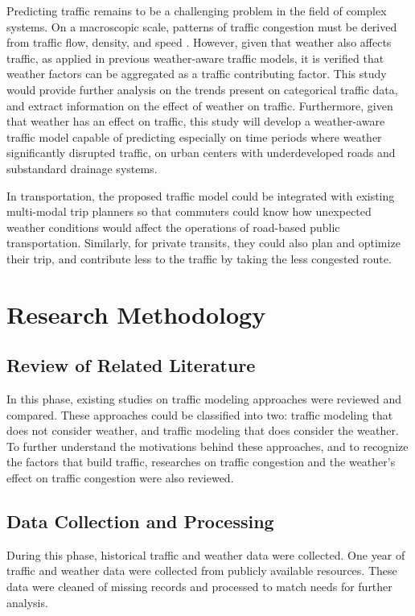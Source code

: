 Predicting traffic remains to be a challenging problem in the field of complex systems. On a macroscopic scale, patterns of traffic congestion must be derived from traffic flow, density, and speed  . However, given that weather also affects traffic, as applied in previous weather-aware traffic models, it is verified that weather factors can be aggregated as a traffic contributing factor. This study would provide further analysis on the trends present on categorical traffic data, and extract information on the effect of weather on traffic. Furthermore, given that weather has an effect on traffic, this study will develop a weather-aware traffic model capable of predicting especially on time periods where weather significantly disrupted traffic, on urban centers with underdeveloped roads and substandard drainage systems. 

In transportation, the proposed traffic model could be integrated with existing multi-modal trip planners so that commuters could know how unexpected weather conditions would affect the operations of road-based public transportation. Similarly, for private transits, they could also plan and optimize their trip, and contribute less to the traffic by taking the less congested route.


\section{Research Methodology}

\subsection{Review of Related Literature}
In this phase, existing studies on traffic modeling approaches were reviewed and compared. These approaches could be classified into two: traffic modeling that does not consider weather, and traffic modeling that does consider the weather. To further understand the motivations behind these approaches, and to recognize the factors that build traffic, researches on traffic congestion and the weather’s effect on traffic congestion were also reviewed.

\subsection{Data Collection and Processing}
During this phase, historical traffic and weather data were collected. One year of traffic and weather data were collected from publicly available resources. These data were cleaned of missing records and processed to match needs for further analysis. 

